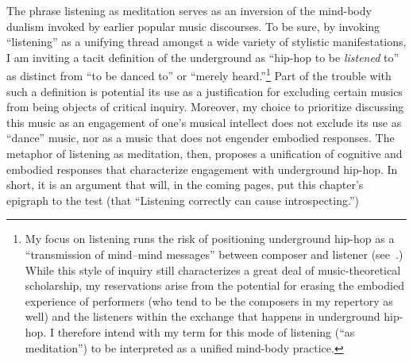 The phrase listening as meditation serves as an inversion of the mind-body dualism invoked by 
earlier popular music discourses. To be sure, by invoking ``listening'' as a unifying thread 
amongst a wide variety of stylistic manifestations, I am inviting a tacit definition of the 
underground as ``hip-hop to be  \emph{listened} to'' as distinct from ``to be danced to'' or 
``merely heard.''\footnote{
    My focus on listening runs the risk of positioning underground hip-hop as a ``transmission of mind--mind messages'' 
    between composer and listener (see~\autocite[20]{suzanneg.cusickFeministTheoryMusic1994}.) While this style of
    inquiry still characterizes a great deal of music-theoretical scholarship, my reservations arise from the potential
    for erasing the embodied experience of performers (who tend to be the composers in my repertory as well) and the
    listeners within the exchange that happens in underground hip-hop. I therefore intend with my term for this mode
    of listening (``as meditation'') to be interpreted as a unified mind-body practice.}
Part of the trouble with such a definition is potential its use as a justification  for excluding certain
musics from being objects of critical inquiry. Moreover, my choice to prioritize discussing 
this music as an engagement of one's musical intellect does not exclude its use as ``dance'' 
music, nor as a music that does not engender embodied responses. The metaphor of listening 
as meditation, then, proposes a unification of cognitive and embodied responses that characterize
engagement with underground hip-hop. In short, it is an argument that will, in the coming pages,
put this chapter's epigraph to the test (that ``Listening correctly can cause introspecting.'')

